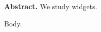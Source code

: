\documentclass{article}
\makeatletter
\def\abstract#1{\gdef\@myabstract{#1}}
\def\showabs{\par\noindent\textbf{Abstract.} \@myabstract\par}
\makeatother
\begin{document}
\abstract{We study widgets.}
\showabs
Body.
\end{document}
